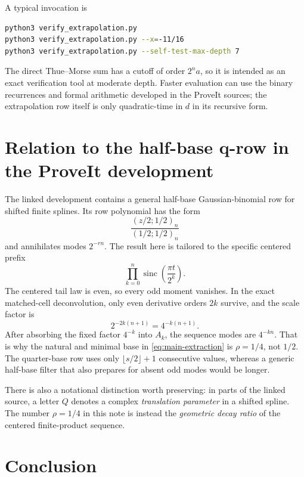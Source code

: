 \documentclass[11pt]{article}
\newcommand{\sinc}{\operatorname{sinc}}
\begin{document}
A typical invocation is
\begin{lstlisting}[language=bash]
python3 verify_extrapolation.py
python3 verify_extrapolation.py --x=-11/16
python3 verify_extrapolation.py --self-test-max-depth 7
\end{lstlisting}
The direct Thue--Morse sum has a cutoff of order $2^n a$, so it is intended as
an exact verification tool at moderate depth.  Faster evaluation can use the
binary recurrences and formal arithmetic developed in the ProveIt sources;
the extrapolation row itself is only quadratic-time in $d$ in its recursive
form.

\section{Relation to the half-base q-row in the ProveIt development}

The linked development contains a general half-base Gaussian-binomial row for
shifted finite splines.  Its row polynomial has the form
\begin{equation}
 \frac{(z/2;1/2)_n}{(1/2;1/2)_n}
\end{equation}
and annihilates modes $2^{-rn}$.  The result here is tailored to the specific
centered prefix
\begin{equation}
 \prod_{k=0}^{n}\sinc\!\left(\frac{\pi t}{2^k}\right).
\end{equation}
The centered tail law is even, so every odd moment vanishes.  In the exact
matched-cell deconvolution, only even derivative orders $2k$ survive, and the
scale factor is
\begin{equation}
 2^{-2k(n+1)}=4^{-k(n+1)}.
\end{equation}
After absorbing the fixed factor $4^{-k}$ into $A_k$, the sequence modes are
$4^{-kn}$.  That is why the natural and minimal base in
\eqref{eq:main-extraction} is $\rho=1/4$, not $1/2$.  The quarter-base row uses
only $\lfloor s/2\rfloor+1$ consecutive values, whereas a generic half-base
filter that also prepares for absent odd modes would be longer.

There is also a notational distinction worth preserving: in parts of the
linked source, a letter $Q$ denotes a complex \emph{translation parameter} in
a shifted spline.  The number $\rho=1/4$ in this note is instead the
\emph{geometric decay ratio} of the centered finite-product sequence.

\section{Conclusion}
\end{document}

